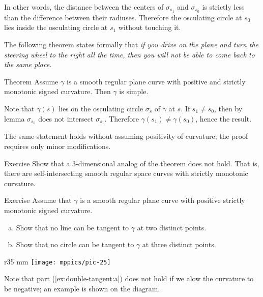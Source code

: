 In other words, the distance between the centers of $\sigma_{s_1}$ and $\sigma_{s_0}$
is strictly less than the difference between their radiuses.
Therefore the osculating circle at $s_0$ lies inside the osculating circle at $s_1$ without touching it.
\qeds

The following theorem states formally that 
\emph{if you drive on the plane and turn the steering wheel to the right all the time,
then you will not be able to come back to the same place.}

\begin{thm}{Theorem}\label{thm:spiral}
Assume $\gamma$ is a smooth regular plane curve with positive and strictly monotonic signed curvature. 
Then $\gamma$ is simple.
\end{thm}

Note that $\gamma(s)$ lies on the osculating circle $\sigma_s$ of $\gamma$ at $s$.
If $s_1\ne s_0$, then by lemma $\sigma_{s_0}$ does not intersect $\sigma_{s_1}$.
Therefore $\gamma(s_1)\ne \gamma(s_0)$,
hence the result.\qeds

The same statement holds without assuming positivity of curvature; the proof requires only minor modifications.

\begin{thm}{Exercise}\label{ex:3D-spiral}
Show that a 3-dimensional analog of the theorem does not hold.
That is, there are self-intersecting smooth regular space curves with strictly monotonic curvature.
\end{thm}

\begin{thm}{Exercise}\label{ex:double-tangent}
Assume that $\gamma$ is a smooth regular plane curve with positive strictly monotonic signed curvature.
\begin{enumerate}[(a)]
\item\label{ex:double-tangent:a}Show that no line can be tangent to $\gamma$ at two distinct points.
\item Show that no circle can be tangent to $\gamma$ at three distinct points. 
\end{enumerate}
\end{thm} %

{

\begin{wrapfigure}{r}{35 mm}
\vskip-4mm
\centering
\texttt{[image: mppics/pic-25]}
\vskip0mm
\end{wrapfigure}

Note that part (\ref{ex:double-tangent:a}) does not hold if we alow the curvature to be negative; an example is shown on the diagram.

}

